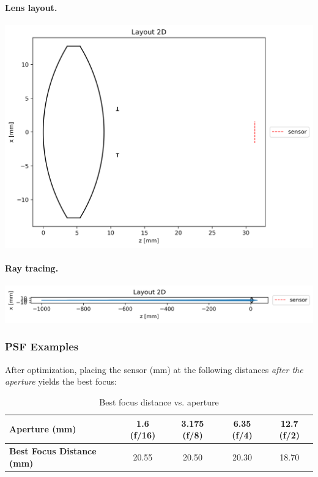 \documentclass[11pt,a4paper]{article}
\newcommand{\pandocbounded}[1]{#1}
\begin{document}
	\paragraph{Lens layout.}%
	\pandocbounded{\includegraphics[width=\linewidth,keepaspectratio]{biconvex_layout.png}}
	
	\paragraph{Ray tracing.}%
	\pandocbounded{\includegraphics[width=\linewidth,keepaspectratio]{biconvex_rays.png}}
	
	\subsubsection*{PSF Examples}\label{psf-examples}
	
	After optimization, placing the sensor (mm) at the following distances \emph{after the aperture} yields the best focus:
	
	\begin{table}[H]
		\centering
		\caption{Best focus distance vs. aperture}
		\begin{tabular}{lcccc}
			\toprule
			\textbf{Aperture (mm)} & \textbf{1.6 (f/16)} & \textbf{3.175 (f/8)} & \textbf{6.35 (f/4)} & \textbf{12.7 (f/2)} \\
			\midrule
			\textbf{Best Focus Distance (mm)} & 20.55 & 20.50 & 20.30 & 18.70 \\
			\bottomrule
		\end{tabular}
	\end{table}
	
\end{document}
